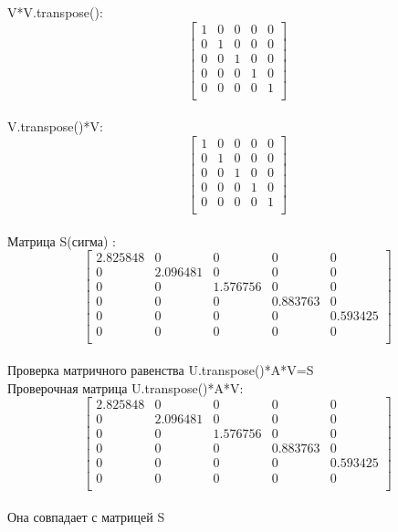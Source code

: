 \documentclass[13pt,a4paper]{scrartcl}
\begin{document}
V*V.transpose():\\
$$
\left[
\begin{array}{ccccc}
1& 0& 0& 0& 0\\
0& 1& 0& 0& 0\\
0& 0& 1& 0& 0\\
0& 0& 0& 1& 0\\
0& 0& 0& 0& 1\\
\end{array}
\right]
$$\\

V.transpose()*V:\\
$$
\left[
\begin{array}{ccccc}
1& 0& 0& 0& 0\\
0& 1& 0& 0& 0\\
0& 0& 1& 0& 0\\
0& 0& 0& 1& 0\\
0& 0& 0& 0& 1\\
\end{array}
\right]
$$\\

Матрица S(сигма) :\\
$$
\left[
\begin{array}{ccccc}
2.825848& 0& 0& 0& 0\\    
0&  2.096481& 0& 0& 0\\   
0&  0&  1.576756& 0& 0\\  
0&  0&  0&  0.883763& 0 \\
0&  0&  0&  0&  0.593425\\
0&  0&  0&   0&  0 \\
\end{array}
\right]
$$\\


Проверка матричного равенства U.transpose()*A*V=S\\
Проверочная матрица  U.transpose()*A*V:\\
$$
\left[
\begin{array}{ccccc}
2.825848& 0& 0& 0& 0\\    
0&  2.096481& 0& 0& 0\\   
0&  0&  1.576756& 0& 0\\  
0&  0&  0&  0.883763& 0 \\
0&  0&  0&  0&  0.593425\\
0&  0&  0&   0&  0 \\
\end{array}
\right]
$$\\
Она совпадает с матрицей S\\
\end{document}
